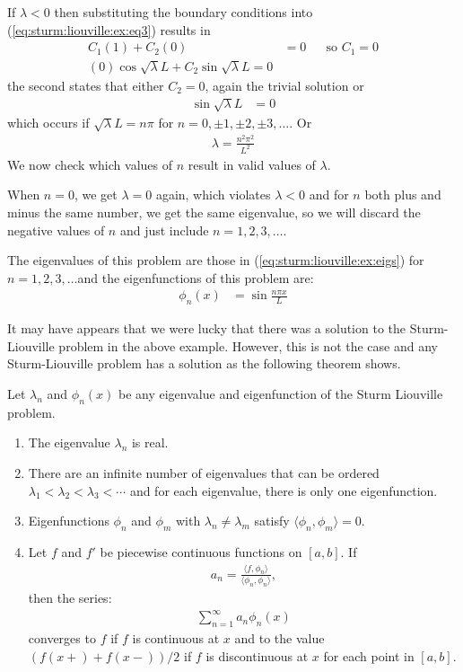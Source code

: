 \begin{example}
If $\lambda<0$ then substituting the boundary conditions into (\ref{eq:sturm:liouville:ex:eq3}) results in
%
\begin{align*}
C_1 (1) + C_2 (0) & = 0 && \text{so $C_1=0$} \\
(0) \cos \sqrt{\lambda} L + C_2 \sin \sqrt{\lambda} L = 0
\end{align*}
the second states that either $C_2=0$, again the trivial solution or
%
\begin{align*}
\sin \sqrt{\lambda} L & = 0
\end{align*}
which occurs if $\sqrt{\lambda} L = n \pi$ for $n=0,\pm 1, \pm 2, \pm 3, \ldots$.   Or
%
\begin{align} \label{eq:sturm:liouville:ex:eigs}
\lambda = \frac{n^2 \pi^2}{L^2}
\end{align}
We now check which values of $n$ result in valid values of $\lambda$.

When $n=0$, we get $\lambda=0$ again, which violates $\lambda<0$ and for $n$ both plus and minus the same number, we get the same eigenvalue, so we will discard the negative values of $n$ and just include $n=1,2,3, \ldots. $

The eigenvalues of this problem are those in (\ref{eq:sturm:liouville:ex:eigs}) for $n=1,2,3,\ldots$and the eigenfunctions of this problem are:
%
\begin{align*}
\phi_n(x) & = \sin \frac{n\pi x}{L}
\end{align*}

\end{example}

It may have appears that we were lucky that there was a solution to the Sturm-Liouville problem in the above example.  However, this is not the case and any Sturm-Liouville problem has a solution as the following theorem shows.


\begin{theorem} \label{thm:sturm:liouville}
Let $\lambda_n$ and $\phi_n(x)$ be any eigenvalue and eigenfunction of the Sturm Liouville problem.
\begin{enumerate}
\item The eigenvalue $\lambda_n$ is real.
\item There are an infinite number of eigenvalues that can be ordered $\lambda_1 < \lambda_2< \lambda_3 < \cdots $ and for each eigenvalue, there is only one eigenfunction.
\item Eigenfunctions $\phi_n$ and $\phi_m$ with $\lambda_n \neq \lambda_m$ satisfy $\langle \phi_n , \phi_m \rangle = 0$.
\item Let $f$ and $f'$ be piecewise continuous functions on $[a,b]$.  If
\begin{align*}
a_n = \frac{\langle f,\phi_n \rangle }{ \langle \phi_n, \phi_n \rangle},
\end{align*}
then the series:
%
\begin{align*}
\sum_{n=1}^{\infty}a_n \phi_n(x)
\end{align*}
converges to $f$ if $f$ is continuous at $x$ and to the value $(f(x+)+f(x-))/2$ if $f$ is discontinuous at $x$ for each point in $[a,b]$.
\end{enumerate}
\end{theorem}

